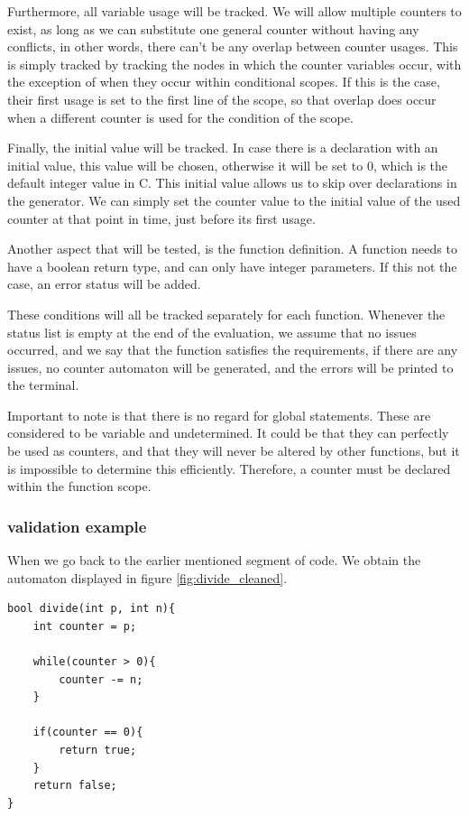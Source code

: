 \documentclass[12pt]{article}
\begin{document}
Furthermore, all variable usage will be tracked. We will allow multiple counters to exist, as long as we can substitute one general counter without having any conflicts, in other words, there can't be any overlap between counter usages. This is simply tracked by tracking the nodes in which the counter variables occur, with the exception of when they occur within conditional scopes. If this is the case, their first usage is set to the first line of the scope, so that overlap does occur when a different counter is used for the condition of the scope. 

Finally, the initial value will be tracked. In case there is a declaration with an initial value, this value will be chosen, otherwise it will be set to 0, which is the default integer value in C. This initial value allows us to skip over declarations in the generator. We can simply set the counter value to the initial value of the used counter at that point in time, just before its first usage.

Another aspect that will be tested, is the function definition. A function needs to have a boolean return type, and can only have integer parameters. If this not the case, an error status will be added.

These conditions will all be tracked separately for each function. Whenever the status list is empty at the end of the evaluation, we assume that no issues occurred, and we say that the function satisfies the requirements, if there are any issues, no counter automaton will be generated, and the errors will be printed to the terminal.

Important to note is that there is no regard for global statements. These are considered to be variable and undetermined. It could be that they can perfectly be used as counters, and that they will never be altered by other functions, but it is impossible to determine this efficiently. Therefore, a counter must be declared within the function scope.

\subsubsection{validation example}
When we go back to the earlier mentioned segment of code. We obtain the automaton displayed in figure \ref{fig:divide_cleaned}.

\begin{lstlisting}[style=CStyle]
bool divide(int p, int n){
	int counter = p;
	
	while(counter > 0){
		counter -= n;
	}
	
	if(counter == 0){
		return true;
	}
	return false;
}
\end{lstlisting}
\end{document}
